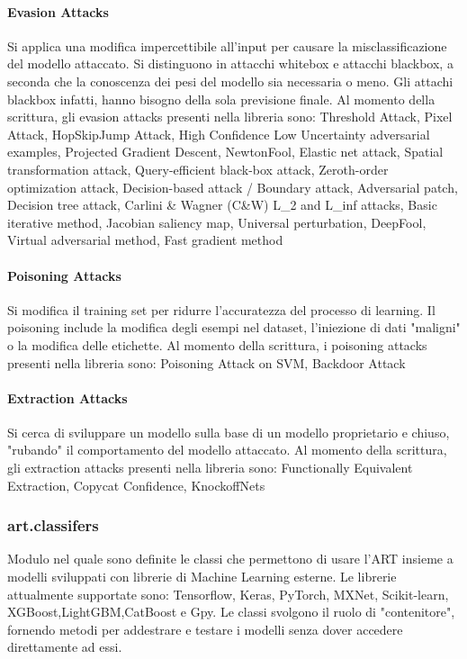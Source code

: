 \paragraph{Evasion Attacks}
Si applica una modifica impercettibile all'input per causare la misclassificazione  del modello attaccato. Si distinguono in attacchi whitebox  e attacchi blackbox, a seconda che la conoscenza dei pesi del modello
sia necessaria o meno. Gli attachi blackbox infatti, hanno bisogno della sola previsione finale. Al momento della scrittura, gli evasion attacks presenti nella libreria sono:
 Threshold Attack, Pixel Attack, HopSkipJump Attack, High Confidence Low Uncertainty adversarial examples, Projected Gradient Descent, NewtonFool, Elastic net attack,
Spatial transformation attack, Query-efficient black-box attack, Zeroth-order optimization attack, Decision-based attack / Boundary attack, Adversarial patch, Decision tree attack,
Carlini \& Wagner   (C\&W) L\_2 and L\_inf attacks, Basic iterative method, Jacobian saliency map, Universal perturbation, DeepFool, Virtual adversarial method, Fast gradient method

\paragraph{Poisoning Attacks}
Si modifica il training set per ridurre l'accuratezza del processo di learning. Il poisoning include la modifica degli esempi nel dataset, l'iniezione di dati "maligni" o la modifica
delle etichette. Al momento della scrittura, i poisoning attacks presenti nella libreria sono: Poisoning Attack on SVM, Backdoor Attack

\paragraph{Extraction Attacks} Si cerca di sviluppare un modello sulla base di un modello proprietario e chiuso, "rubando" il comportamento del modello attaccato. Al momento della scrittura, gli extraction attacks presenti nella libreria sono: 
Functionally Equivalent Extraction, Copycat Confidence, KnockoffNets

\subsubsection{art.classifers}
Modulo nel quale sono definite le classi che permettono di usare l'ART insieme a modelli sviluppati con librerie di Machine Learning esterne.  Le librerie attualmente supportate sono: 
Tensorflow, Keras, PyTorch, MXNet, Scikit-learn, XGBoost,LightGBM,CatBoost e Gpy. Le classi svolgono il ruolo di "contenitore", fornendo metodi per addestrare e testare i modelli senza dover accedere direttamente
ad essi.
